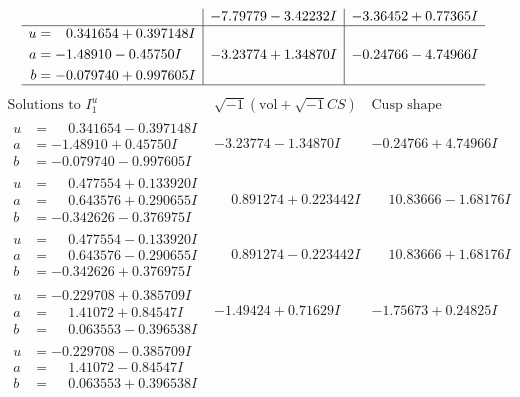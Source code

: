 \documentclass[1p]{elsarticle_modified}
\theoremstyle{definition}
\newcommand{\I}{\sqrt{-1}}
\begin{document}
$$\begin{array}{c|c|c}
 & -7.79779 - 3.42232 I & -3.36452 + 0.77365 I \\ \hline\begin{aligned}
u &= \phantom{-}0.341654 + 0.397148 I \\
a &= -1.48910 - 0.45750 I \\
b &= -0.079740 + 0.997605 I\end{aligned}
 & -3.23774 + 1.34870 I & -0.24766 - 4.74966 I\\
 \hline 
 \end{array}$$\newpage$$\begin{array}{c|c|c}  
\text{Solutions to }I^u_{1}& \I (\text{vol} + \sqrt{-1}CS) & \text{Cusp shape}\\
 \hline 
\begin{aligned}
u &= \phantom{-}0.341654 - 0.397148 I \\
a &= -1.48910 + 0.45750 I \\
b &= -0.079740 - 0.997605 I\end{aligned}
 & -3.23774 - 1.34870 I & -0.24766 + 4.74966 I \\ \hline\begin{aligned}
u &= \phantom{-}0.477554 + 0.133920 I \\
a &= \phantom{-}0.643576 + 0.290655 I \\
b &= -0.342626 - 0.376975 I\end{aligned}
 & \phantom{-}0.891274 + 0.223442 I & \phantom{-}10.83666 - 1.68176 I \\ \hline\begin{aligned}
u &= \phantom{-}0.477554 - 0.133920 I \\
a &= \phantom{-}0.643576 - 0.290655 I \\
b &= -0.342626 + 0.376975 I\end{aligned}
 & \phantom{-}0.891274 - 0.223442 I & \phantom{-}10.83666 + 1.68176 I \\ \hline\begin{aligned}
u &= -0.229708 + 0.385709 I \\
a &= \phantom{-}1.41072 + 0.84547 I \\
b &= \phantom{-}0.063553 - 0.396538 I\end{aligned}
 & -1.49424 + 0.71629 I & -1.75673 + 0.24825 I \\ \hline\begin{aligned}
u &= -0.229708 - 0.385709 I \\
a &= \phantom{-}1.41072 - 0.84547 I \\
b &= \phantom{-}0.063553 + 0.396538 I\end{aligned}

\end{array}$$
\end{document}
